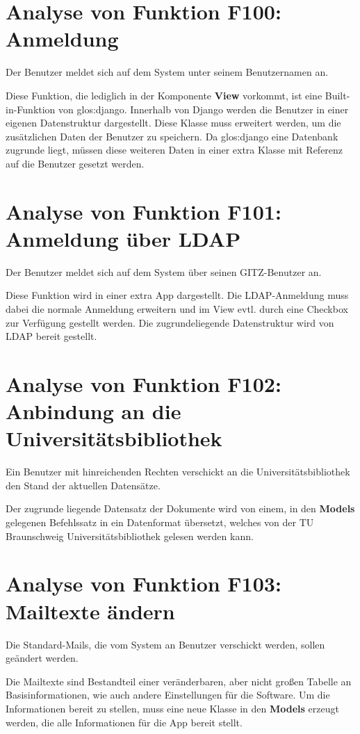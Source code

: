 \section{Analyse von Funktion F100: Anmeldung}
Der Benutzer meldet sich auf dem System unter seinem Benutzernamen an.

Diese Funktion, die lediglich in der Komponente \textbf{View} vorkommt, ist
eine Built-in-Funktion von \gls{glos:django}. Innerhalb von Django werden die Benutzer
in einer eigenen Datenstruktur  dargestellt. Diese Klasse muss erweitert werden,
um die zusätzlichen Daten der Benutzer zu speichern. Da \gls{glos:django} eine Datenbank
zugrunde liegt, müssen diese weiteren Daten in einer extra Klasse mit Referenz
auf die Benutzer gesetzt werden.

\section{Analyse von Funktion F101: Anmeldung über LDAP}
Der Benutzer meldet sich auf dem System über seinen \Gls{GITZ}-Benutzer an.

Diese Funktion wird in einer extra App dargestellt. Die \gls{LDAP}-Anmeldung muss
dabei die normale Anmeldung erweitern und im View evtl. durch eine Checkbox zur
Verfügung gestellt werden. Die zugrundeliegende Datenstruktur wird von \gls{LDAP}
bereit gestellt.

\section{Analyse von Funktion F102: Anbindung an die Universitätsbibliothek}
Ein Benutzer mit hinreichenden Rechten verschickt an die Universitätsbibliothek
den Stand der aktuellen Datensätze.

Der zugrunde liegende Datensatz der Dokumente wird von einem, in den
\textbf{Models} gelegenen Befehlssatz in ein Datenformat übersetzt, welches von
der TU Braunschweig Universitätsbibliothek gelesen werden kann. 

\section{Analyse von Funktion F103: Mailtexte ändern}
Die Standard-Mails, die vom System an Benutzer verschickt werden, sollen geändert
werden.

Die Mailtexte sind Bestandteil einer veränderbaren, aber nicht großen Tabelle an
Basisinformationen, wie auch andere Einstellungen für die Software. Um die
Informationen bereit zu stellen, muss eine neue Klasse in den \textbf{Models}
erzeugt werden, die alle Informationen für die App bereit stellt.

